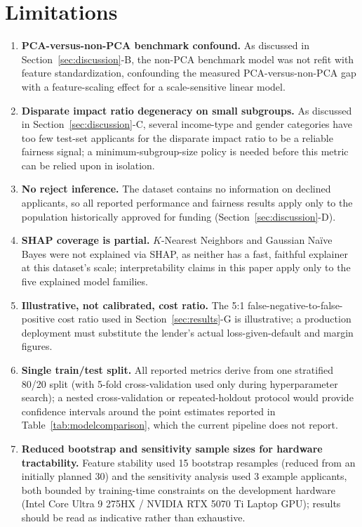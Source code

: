 \documentclass[journal]{IEEEtran}
\begin{document}
\section{Limitations}
\label{sec:limitations}

\begin{enumerate}
\item \textbf{PCA-versus-non-PCA benchmark confound.} As discussed in Section~\ref{sec:discussion}-B, the non-PCA benchmark model was not refit with feature standardization, confounding the measured PCA-versus-non-PCA gap with a feature-scaling effect for a scale-sensitive linear model.
\item \textbf{Disparate impact ratio degeneracy on small subgroups.} As discussed in Section~\ref{sec:discussion}-C, several income-type and gender categories have too few test-set applicants for the disparate impact ratio to be a reliable fairness signal; a minimum-subgroup-size policy is needed before this metric can be relied upon in isolation.
\item \textbf{No reject inference.} The dataset contains no information on declined applicants, so all reported performance and fairness results apply only to the population historically approved for funding (Section~\ref{sec:discussion}-D).
\item \textbf{SHAP coverage is partial.} $K$-Nearest Neighbors and Gaussian Naïve Bayes were not explained via SHAP, as neither has a fast, faithful explainer at this dataset's scale; interpretability claims in this paper apply only to the five explained model families.
\item \textbf{Illustrative, not calibrated, cost ratio.} The 5:1 false-negative-to-false-positive cost ratio used in Section~\ref{sec:results}-G is illustrative; a production deployment must substitute the lender's actual loss-given-default and margin figures.
\item \textbf{Single train/test split.} All reported metrics derive from one stratified 80/20 split (with 5-fold cross-validation used only during hyperparameter search); a nested cross-validation or repeated-holdout protocol would provide confidence intervals around the point estimates reported in Table~\ref{tab:modelcomparison}, which the current pipeline does not report.
\item \textbf{Reduced bootstrap and sensitivity sample sizes for hardware tractability.} Feature stability used 15 bootstrap resamples (reduced from an initially planned 30) and the sensitivity analysis used 3 example applicants, both bounded by training-time constraints on the development hardware (Intel Core Ultra 9 275HX / NVIDIA RTX 5070 Ti Laptop GPU); results should be read as indicative rather than exhaustive.
\end{enumerate}
\end{document}
